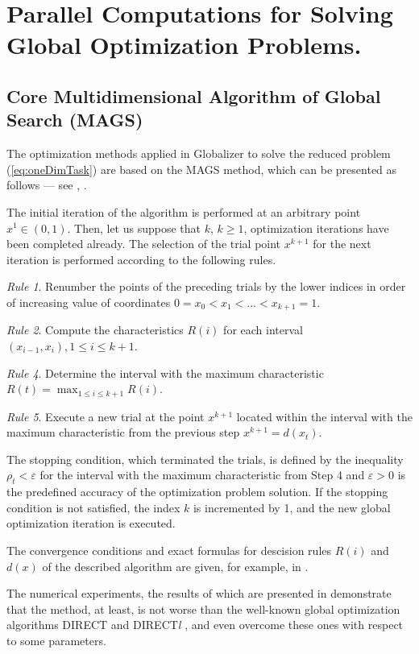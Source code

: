 \documentclass[runningheads]{llncs}
\begin{document}
\section{Parallel Computations for Solving Global Optimization Problems.}
\subsection{Core Multidimensional Algorithm of Global Search (MAGS)}

The optimization methods applied in Globalizer to solve the reduced problem
(\ref{eq:oneDimTask}) are based on the MAGS method, which can be presented as follows ---
see \cite{strongin1978}, \cite{strSergGO}.
\par
The initial iteration of the algorithm is performed at an arbitrary point \mbox{\(x^1\in(0,1)\)}.
Then, let us suppose that \(k\), \(k\ge 1\), optimization iterations have been completed already.
The selection of the trial point \(x^{k+1}\) for the next iteration is performed according to the
following rules.

\textit{Rule 1}. Renumber the points of the preceding trials by the lower indices in order of
increasing value of coordinates
$0=x_0<x_1<...<x_{k+1}=1$.

\textit{Rule 2}. Compute the characteristics \(R(i)\) for each interval \((x_{i-1},x_i),1\leq i\leq
k+1\).

\textit{Rule 4}. Determine the interval with the maximum characteristic $R(t)=\max_{1\leq i
\leq k+1}R(i)$.

\textit{Rule 5}. Execute a new trial at the point \(x^{k+1}\) located within the interval with the
maximum characteristic from the previous step
  $x^{k+1}=d(x_t)$.

The stopping condition, which terminated the trials, is defined by the inequality
$\rho_t<\varepsilon$
for the interval with the maximum characteristic from Step 4 and \(\varepsilon >0\) is the
predefined
accuracy of the optimization problem solution. If the stopping condition is not satisfied,
the index \(k\) is incremented by 1, and the new global optimization iteration is executed.

The convergence conditions and exact formulas for descision rules $R(i)$ and $d(x)$ of the
described algorithm are given, for example, in \cite{strSergGO}.

The numerical experiments, the results of which are presented in \cite{GergelLebedev,GergelSidorov} demonstrate that the method, at least, is not worse than the well-known global optimization algorithms DIRECT \cite{Jones} and DIRECT\textit{l} \cite{Gablonsky}, and even overcome these ones with respect to some parameters.
\end{document}
